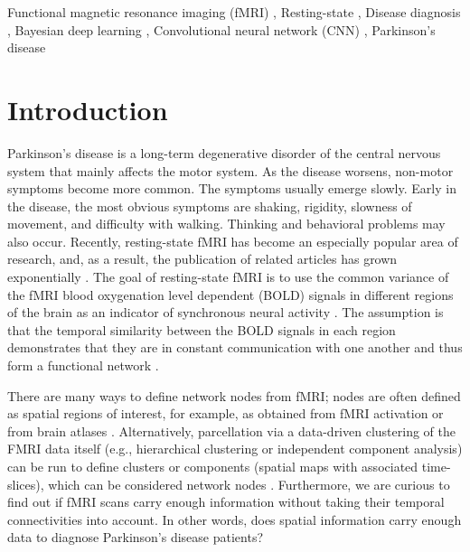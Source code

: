 \documentclass[preprint,12pt]{elsarticle}
\begin{document}

\begin{keyword}
Functional magnetic resonance imaging (fMRI) \sep
Resting-state \sep
Disease diagnosis \sep
Bayesian deep learning \sep
Convolutional neural network (CNN) \sep
Parkinson's disease
\end{keyword}


\maketitle

\linenumbers

\section{Introduction}

Parkinson's disease is a long-term degenerative disorder of the central nervous system that mainly affects the motor system. As the disease worsens, non-motor symptoms become more common. The symptoms usually emerge slowly. Early in the disease, the most obvious symptoms are shaking, rigidity, slowness of movement, and difficulty with walking. Thinking and behavioral problems may also occur. Recently, resting-state fMRI has become an especially popular area of research, and, as a result, the publication of related articles has grown exponentially \cite{Murphy2013}. The goal of resting-state fMRI is to use the common variance of the fMRI blood oxygenation level dependent (BOLD) signals in different regions of the brain as an indicator of synchronous neural activity \cite{GomezLaberge2011}\cite{Oikonomou2010}. The assumption is that the temporal similarity between the BOLD signals in each region demonstrates that they are in constant communication with one another and thus form a functional network \cite{Calhoun2016}.

There are many ways to define network nodes from fMRI; nodes are often defined as spatial regions of interest, for example, as obtained from fMRI activation or from brain atlases \cite{Arribas2010}\cite{Calhoun2012}. Alternatively, parcellation via a data-driven clustering of the FMRI data itself (e.g., hierarchical clustering or independent component analysis) can be run to define clusters or components (spatial maps with associated time-slices), which can be considered network nodes \cite{Smith2012}. Furthermore, we are curious to find out if fMRI scans carry enough information without taking their temporal connectivities into account. In other words, does spatial information carry enough data to diagnose Parkinson's disease patients?
\end{document}
